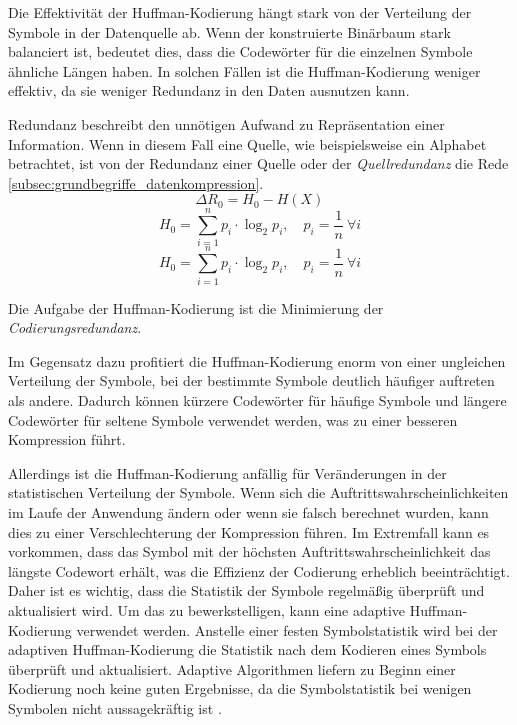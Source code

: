 Die Effektivität der Huffman-Kodierung hängt stark von der Verteilung der Symbole in der Datenquelle ab. 
Wenn der konstruierte Binärbaum stark balanciert ist, bedeutet dies, dass die Codewörter für die einzelnen Symbole ähnliche Längen haben.
In solchen Fällen ist die Huffman-Kodierung weniger effektiv, da sie weniger Redundanz in den Daten ausnutzen kann.

Redundanz beschreibt den unnötigen Aufwand zu Repräsentation einer Information.
Wenn in diesem Fall eine Quelle, wie beispielsweise ein Alphabet betrachtet, ist von der Redundanz einer Quelle oder der \textit{Quellredundanz} die Rede \ref{subsec:grundbegriffe_datenkompression}.
\begin{equation*}
\Delta R_0 = H_0 - H(X)
\end{equation*}
\begin{equation*}
H_0 = \sum_{i=1}^{n} p_i \cdot \log_2{p_i} , \quad p_i = \frac{1}{n} \ \forall i
\end{equation*}
\begin{equation*}
H_0 = \sum_{i=1}^{n} p_i \cdot \log_2{p_i} , \quad p_i = \frac{1}{n} \ \forall i
\end{equation*}

Die Aufgabe der Huffman-Kodierung ist die Minimierung der \textit{Codierungsredundanz}.

Im Gegensatz dazu profitiert die Huffman-Kodierung enorm von einer ungleichen Verteilung der Symbole, bei der bestimmte Symbole deutlich häufiger auftreten als andere. 
Dadurch können kürzere Codewörter für häufige Symbole und längere Codewörter für seltene Symbole verwendet werden, was zu einer besseren Kompression führt.

Allerdings ist die Huffman-Kodierung anfällig für Veränderungen in der statistischen Verteilung der Symbole. 
Wenn sich die Auftrittswahrscheinlichkeiten im Laufe der Anwendung ändern oder wenn sie falsch berechnet wurden, kann dies zu einer Verschlechterung der Kompression führen. 
Im Extremfall kann es vorkommen, dass das Symbol mit der höchsten Auftrittswahrscheinlichkeit das längste Codewort erhält, was die Effizienz der Codierung erheblich beeinträchtigt. 
Daher ist es wichtig, dass die Statistik der Symbole regelmäßig überprüft und aktualisiert wird.
Um das zu bewerkstelligen, kann eine adaptive Huffman-Kodierung verwendet werden. 
Anstelle einer festen Symbolstatistik wird bei der adaptiven Huffman-Kodierung die Statistik nach dem Kodieren eines Symbols überprüft und aktualisiert. 
Adaptive Algorithmen liefern zu Beginn einer Kodierung noch keine guten Ergebnisse, da die Symbolstatistik bei wenigen Symbolen nicht aussagekräftig ist \cite{Jeon1998}.

